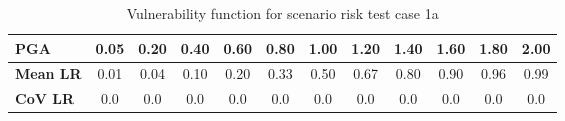 \begin{table}[htbp]

\centering
\begin{tabular}{ l c c c c c c c c c c c}

\hline
\rowcolor{anti-flashwhite}
\bf{PGA} & 0.05 & 0.20 & 0.40 & 0.60 & 0.80 & 1.00 & 1.20 & 1.40 & 1.60 & 1.80 & 2.00 \\
\hline
\bf{Mean LR} & 0.01 & 0.04 & 0.10 & 0.20 & 0.33 & 0.50 & 0.67 & 0.80 & 0.90 & 0.96 & 0.99 \\
\bf{CoV LR} & 0.0 & 0.0 & 0.0 & 0.0 & 0.0 & 0.0 & 0.0 & 0.0 & 0.0 & 0.0 & 0.0 \\
\hline
\end{tabular}

\caption{Vulnerability function for scenario risk test case 1a}
\label{tab:scenario-vf-zero-cov}
\end{table}